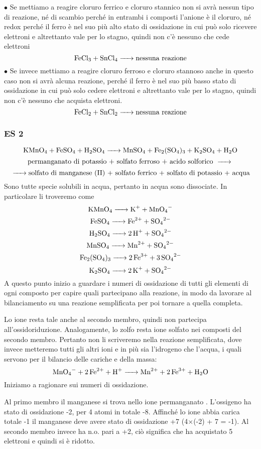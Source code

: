 $\bullet$ Se mettiamo a reagire cloruro ferrico  e cloruro stannico  non si avrà nessun tipo di reazione, né di scambio perché in entrambi i composti l'anione è il cloruro, né redox perché il ferro è nel suo più alto stato di ossidazione in cui può solo ricevere elettroni e altrettanto vale per lo stagno, quindi non c'è nessuno che cede elettroni
$$\ce{FeCl_3 +  SnCl_4 ->}\text{nessuna reazione}$$
$\bullet$ Se invece mettiamo a reagire cloruro ferroso  e cloruro stannoso  anche in questo caso non si avrà alcuna reazione, perché il ferro è nel suo più basso stato di ossidazione in cui può solo cedere elettroni e altrettanto vale per lo stagno, quindi non c'è nessuno che acquista elettroni.
$$\ce{FeCl_2 + SnCl_2 ->}\text{nessuna reazione}$$
\subsubsection{\textbf{ES 2}}
$$\ce{KMnO_4 + FeSO_4 + H_2SO_4 -> MnSO_4 + Fe_2(SO_4)_3 + K_2SO_4 + H_2O}$$
$$\text{permanganato di potassio + solfato ferroso + acido solforico \ce{->}}$$
$$\ce{->}\text{solfato di manganese (II) + solfato ferrico + solfato di potassio + acqua}$$
Sono tutte specie solubili in acqua, pertanto in acqua sono dissociate. In particolare li troveremo come
$$\ce{KMnO_4 -> K^+ + MnO_4^-}$$
$$\ce{FeSO_4 -> Fe^{2+} + SO_4^{2-}}$$
$$\ce{H_2SO_4 -> 2 H^+ + SO_4^{2-}}$$
$$\ce{MnSO_4 -> Mn^{2+} + SO_4^{2-}}$$
$$\ce{Fe_2(SO_4)_3 -> 2 Fe^{3+} + 3 SO_4^{2-}}$$
$$\ce{K_2SO_4 -> 2 K^+ + SO_4^{2-}}$$
A questo punto inizio a guardare i numeri di ossidazione di tutti gli elementi di ogni composto per capire quali partecipano alla reazione, in modo da lavorare al bilanciamento su una reazione semplificata per poi tornare a quella completa.

Lo ione  resta tale anche al secondo membro, quindi non partecipa all'ossidoriduzione. Analogamente, lo zolfo resta ione solfato  nei composti del secondo membro. Pertanto non li scriveremo nella reazione semplificata, dove invece metteremo tutti gli altri ioni e in più sia l'idrogeno  che l'acqua, i quali servono per il bilancio delle cariche e della massa:
$$\ce{MnO_4- + 2Fe^2+ + H+ -> Mn^2+ + 2Fe^3+ + H_2O}$$
Iniziamo a ragionare sui numeri di ossidazione.

Al primo membro il manganese si trova nello ione permanganato . L'ossigeno ha stato di ossidazione -2, per 4 atomi in totale -8. Affinché lo ione abbia carica totale -1 il manganese deve avere stato di ossidazione +7 (4$\times$(-2) + 7 = -1). Al secondo membro invece ha n.o. pari a +2, ciò significa che ha acquistato 5 elettroni e quindi si è ridotto.

